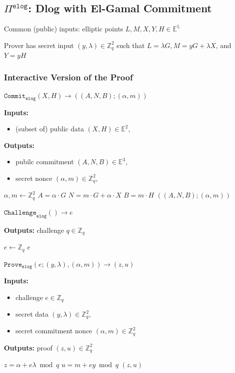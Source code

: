 \documentclass[11pt]{article}
\newenvironment{inlineAlgorithm}{}{}
\newcommand{\algoName}[1]{#1 \par}
\newcommand{\algoInputsList}[1]{
    {\small \bf Inputs:} 
        \begin{itemize}[noitemsep,topsep=0pt]
            #1
        \end{itemize}
}
\newcommand{\algoOutputs}[1]{
    {\small \bf Outputs:} #1 \par
}
\newcommand{\algoOutputsList}[1]{
    {\small \bf Outputs:}
        \begin{itemize}[noitemsep,topsep=0pt]
            #1
        \end{itemize}
}
\newcommand{\proof}[1]{\ensuremath{\Pi^{\mathtt{#1}}}}
\newcommand{\commit}[1]{\ensuremath{\mathtt{Commit}_{\mathtt{#1}}}}
\newcommand{\challenge}[1]{\ensuremath{\mathtt{Challenge}_{\mathtt{#1}}}}
\newcommand{\prove}[1]{\ensuremath{\mathtt{Prove}_{\mathtt{#1}}}}
\newcommand{\E}{\mathbb{E}}
\newcommand{\Z}{\mathbb{Z}}
\newcommand{\?}[1]{\stackrel{?}{#1}}
\begin{document}
\subsection{\proof{elog}: Dlog with El-Gamal Commitment}

Common (public) inputs: elliptic points $L, M, X, Y, H \in \E^5$

Prover has secret input $(y, \lambda) \in \Z_q^2$ such that $L = \lambda G, M = y G + \lambda X$, and $Y = y H$

\subsubsection{Interactive Version of the Proof}

\begin{description}

\item
\begin{inlineAlgorithm}
\algoName{$\commit{elog}(X, H) \to ((A, N, B); (\alpha, m))$}
\algoInputsList{
    \item (subset of) public data $(X, H) \in \E^2$,
}
\algoOutputsList{
    \item pubilc commitment $(A, N, B) \in \E^3$,
    \item secret nonce $(\alpha, m) \in \Z_q^2$,
}
\begin{algorithmic}[1]
\State $\alpha, m \gets \Z_q^2$
\State $A = \alpha \cdot G$
\State $N = m \cdot G + \alpha \cdot X$
\State $B = m \cdot H$
\State \Return $((A, N, B); (\alpha, m))$
\end{algorithmic}
\end{inlineAlgorithm}

\item
\begin{inlineAlgorithm}
\algoName{$\challenge{elog}() \to e$}
\algoOutputs{challenge $q \in \Z_q$}
\begin{algorithmic}[1]
\State $e \gets \Z_q$
\State \Return $e$
\end{algorithmic}
\end{inlineAlgorithm}

\item
\begin{inlineAlgorithm}
\algoName{$\prove{elog}(e; (y, \lambda), (\alpha, m)) \to (z, u)$}
\algoInputsList{
    \item challenge $e \in \Z_q$
    \item secret data $(y, \lambda) \in \Z_q^2$,
    \item secret commitment nonce $(\alpha, m) \in \Z_q^2$
}
\algoOutputs{proof $(z, u) \in \Z_q^2$}
\begin{algorithmic}[1]
\State $z = \alpha + e \lambda \bmod q$
\State $u = m + e y \bmod q$
\State \Return $(z, u)$
\end{algorithmic}
\end{inlineAlgorithm}


\end{description}
\end{document}
